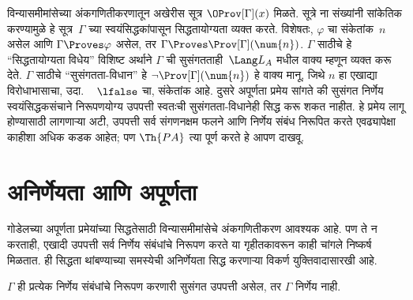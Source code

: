 विन्यासमीमांसेच्या अंकगणितीकरणातून अखेरीस सूत्र
$\OProv[\Gamma](x)$ मिळते. सूत्रे ना संख्यांनी सांकेतिक
करण्यामुळे हे सूत्र~$\Gamma$ च्या स्वयंसिद्धकांपासून सिद्धतायोग्यता
व्यक्त करते. विशेषतः, $\varphi$ चा संकेतांक~$n$ असेल आणि $\Gamma \Proves
\varphi$ असेल, तर $\Gamma \Proves \Prov[\Gamma](\num{n})$.
$\Gamma$ साठीचे हे ``सिद्धतायोग्यता विधेय'' विशिष्ट अर्थाने
$\Gamma$ ची सुसंगतताही~$\Lang L_A$ मधील वाक्य म्हणून
व्यक्त करू देते. $\Gamma$ साठीचे ``सुसंगतता-विधान'' हे
$\lnot \Prov[\Gamma](\num{n})$ हे वाक्य मानू, जिथे $n$ हा
एखाद्या विरोधाभासाचा, उदा. ~ $\lfalse$ चा, संकेतांक आहे.
दुसरे अपूर्णता प्रमेय सांगते की सुसंगत निर्णेय स्वयंसिद्धकसंचाने निरूपणयोग्य उपपत्ती
स्वतःची सुसंगतता-विधानेही सिद्ध करू शकत नाहीत. हे प्रमेय लागू
होण्यासाठी लागणाऱ्या अटी, उपपत्ती सर्व संगणनक्षम फलने आणि
निर्णेय संबंध निरूपित करते एवढ्यापेक्षा काहीशा अधिक
कडक आहेत; पण $\Th{PA}$ त्या पूर्ण करते हे आपण दाखवू.












\section{अनिर्णेयता आणि अपूर्णता}\label{inc:int:dec:sec}

गोडेलच्या अपूर्णता प्रमेयांच्या सिद्धतेसाठी विन्यासमीमांसेचे
अंकगणितीकरण आवश्यक आहे. पण ते न करताही, एखादी उपपत्ती सर्व
निर्णेय संबंधांचे निरूपण करते या गृहीतकावरून काही
चांगले निष्कर्ष मिळतात. ही सिद्धता थांबण्याच्या समस्येची अनिर्णेयता
सिद्ध करणाऱ्या विकर्ण युक्तिवादासारखी आहे.

\begin{thm}
$\Gamma$ ही प्रत्येक निर्णेय संबंधांचे निरूपण
करणारी सुसंगत उपपत्ती असेल, तर $\Gamma$ निर्णेय नाही.
\end{thm}

